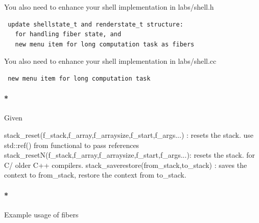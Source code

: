 \documentclass[]{article}
\newenvironment{Shaded}{}{}
\newcommand{\ControlFlowTok}[1]{{#1}}
\newcommand{\NormalTok}[1]{{#1}}
\let\oldparagraph\paragraph
\renewcommand{\paragraph}[1]{\oldparagraph{#1}\mbox{}}
\begin{document}
You also need to enhance your shell implementation in labs/shell.h

\begin{verbatim}
 update shellstate_t and renderstate_t structure:
   for handling fiber state, and
   new menu item for long computation task as fibers
\end{verbatim}

You also need to enhance your shell implementation in labs/shell.cc

\begin{verbatim}
 new menu item for long computation task
\end{verbatim}

\paragraph*{Given}\label{given-5}

\begin{Shaded}
\begin{Highlighting}[]
        \NormalTok{stack_reset(f_stack,f_array,f_arraysize,f_start,f_args...) : resets the stack. use std::ref() from functional to pass references}
        \NormalTok{stack_resetN(f_stack,f_array,f_arraysize,f_start,f_args...): resets the stack. }\ControlFlowTok{for} \NormalTok{C/ older C++ compilers.}
        \NormalTok{stack_saverestore(from_stack,to_stack)                     : saves the context to from_stack, restore the context from to_stack.}
\end{Highlighting}
\end{Shaded}

\paragraph*{Example usage of fibers}\label{example-usage-of-fibers}
\end{document}
